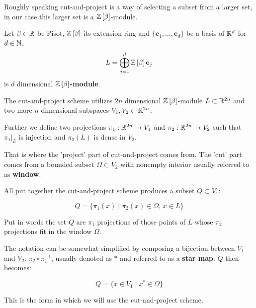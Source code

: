 \documentclass[text.tex]{subfiles}
\begin{document}
Roughly speaking cut-and-project is a way of selecting a subset from a larger set, in our case this larger set is a $\mathbb{Z}\left[\beta\right]$-module. 

\begin{definition}
Let $\beta\in\mathbb{R}$ be Pisot, $\mathbb{Z}\left[\beta\right]$ its extension ring and $\{\mathbf{e}_1, \dots, \mathbf{e}_d\}$ be a basis of $\mathbb{R}^d$ for $d\in\mathbb{N}$. 
$$L = \bigoplus^d_{j=1}\mathbb{Z}\left[\beta\right] \mathbf{e}_j$$
is $d$ dimensional \textbf{$\mathbb{Z}\left[\beta\right]$-module}.
\end{definition} 

The cut-and-project scheme utilizes $2n$ dimensional $\mathbb{Z}\left[\beta\right]$-module $L\subset\mathbb{R}^{2n}$ and two more $n$ dimensional subspaces $V_1, V_2\subset\mathbb{R}^{2n}$. 

Further we define two projections $\pi_1:\mathbb{R}^{2n}\rightarrow V_1$ and $\pi_2:\mathbb{R}^{2n}\rightarrow V_2$ such that $\pi_1|_L$ is injection and $\pi_2(L)$ is dense in $V_2$. 

That is where the 'project' part of cut-and-project comes from. The 'cut' part comes from a bounded subset $\Omega\subset V_2$ with nonempty interior usually referred to as \textbf{window}. 

All put together the cut-and-project scheme produces a subset $Q\subset V_1$:

$$Q = \{ \pi_1(x)\; |\; \pi_2(x)\in \Omega,\,  x\in L \}$$

Put in words the set $Q$ are $\pi_1$ projections of those points of $L$ whose $\pi_2$ projections fit in the window $\Omega$. 

The notation can be somewhat simplified by composing a bijection between $V_1$ and $V_2$: $\pi_2\circ\pi^{-1}_1$, usually denoted as $\ast$ and referred to as a \textbf{star map}. $Q$ then becomes:

$$Q = \{ x \in V_1\; |\; x^\ast\in \Omega \}$$

This is the form in which we will use the cut-and-project scheme. 
\end{document}
